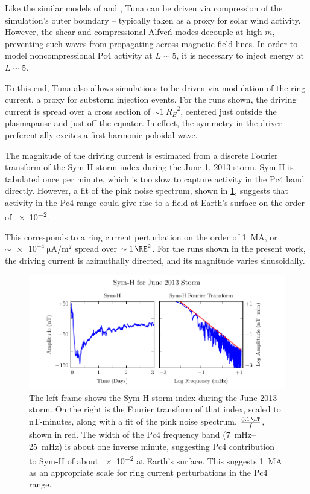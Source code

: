 \documentclass[draft,linenumbers]{agujournal}
\begin{document}

Like the similar models of \citet{lysak_2013} and \citet{waters_2013}, Tuna can be driven via compression of the simulation's outer boundary -- typically taken as a proxy for solar wind activity. However, the shear and compressional Alfve\'n modes decouple at high $m$, preventing such waves from propagating across magnetic field lines. In order to model noncompressional Pc4 activity at $L\sim5$, it is necessary to inject energy at $L\sim5$.

To this end, Tuna also allows simulations to be driven via modulation of the ring current, a proxy for substorm injection events. For the runs shown, the driving current is spread over a cross section of $\sim\SI{1}{R_E}^2$, centered just outside the plasmapause and just off the equator. In effect, the symmetry in the driver preferentially excites a first-harmonic poloidal wave.

The magnitude of the driving current is estimated from a discrete Fourier transform of the Sym-H storm index during the June 1, 2013 storm. Sym-H is tabulated once per minute, which is too slow to capture activity in the Pc4 band directly. However, a fit of the pink noise spectrum, shown in \cref{fig_symh}, suggests that activity in the Pc4 range could give rise to a field at Earth's surface on the order of \SI{e-2}{\nT}.

This corresponds to a ring current perturbation on the order of \SI{1}{\mega\A}, or $\sim\SI{e-4}{\uA/\m\squared}$ spread over $\sim\SI{1}{\RE}^2$. For the runs shown in the present work, the driving current is azimuthally directed, and its magnitude varies sinusoidally.

\begin{figure}
    \begin{center}
    \includegraphics[width=\textwidth]{figures/fig_symh.pdf}
    \caption{
    The left frame shows the Sym-H storm index during the June 2013 storm. On the right is the Fourier transform of that index, scaled to \si{nT}-minutes, along with a fit of the pink noise spectrum, $\frac{ \SI{0.1}{\nT} }{f}$, shown in red. The width of the Pc4 frequency band (\SIrange{7}{25}{\mHz}) is about one inverse minute, suggesting Pc4 contribution to Sym-H of about \SI{e-2}{\nT} at Earth's surface. This suggests \SI{1}{\mega\A} as an appropriate scale for ring current perturbations in the Pc4 range.
    }
    \label{fig_symh}
    \end{center}
\end{figure}
\end{document}
